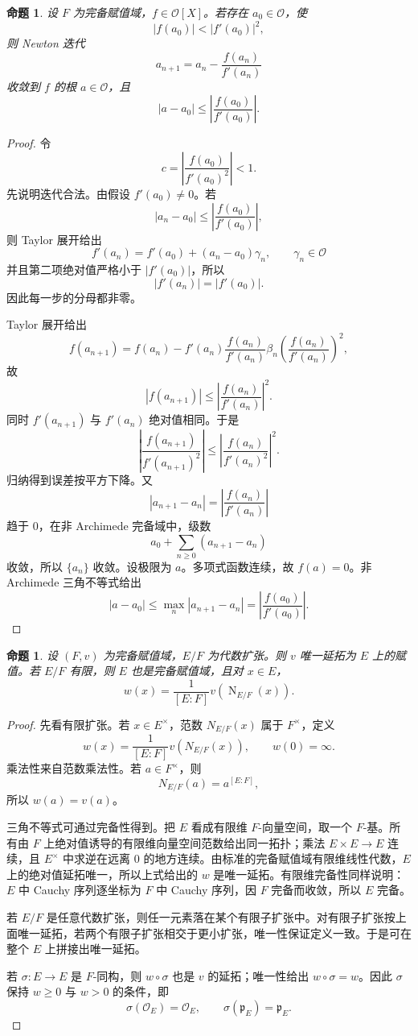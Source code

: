\documentclass[11pt,a4paper,openany]{ctexbook}
\numberwithin{equation}{chapter}
\newcommand{\Nm}{\operatorname{N}}
\theoremstyle{plain}
\newtheorem{proposition}[theorem]{命题}
\theoremstyle{definition}
\theoremstyle{remark}
\begin{document}
\begin{proposition}
设 $F$ 为完备赋值域，$f\in\mathcal O[X]$。若存在 $a_0\in\mathcal O$，使
\[
|f(a_0)|<|f'(a_0)|^2,
\]
则 Newton 迭代
\[
a_{n+1}=a_n-\frac{f(a_n)}{f'(a_n)}
\]
收敛到 $f$ 的根 $a\in\mathcal O$，且
\[
|a-a_0|\le \left|\frac{f(a_0)}{f'(a_0)}\right|.
\]
\end{proposition}

\begin{proof}
令
\[
c=\left|\frac{f(a_0)}{f'(a_0)^2}\right|<1.
\]
先说明迭代合法。由假设 $f'(a_0)\ne0$。若
\[
|a_n-a_0|\le \left|\frac{f(a_0)}{f'(a_0)}\right|,
\]
则 Taylor 展开给出
\[
f'(a_n)=f'(a_0)+(a_n-a_0)\gamma_n,\qquad \gamma_n\in\mathcal O
\]
并且第二项绝对值严格小于 $|f'(a_0)|$，所以
\[
|f'(a_n)|=|f'(a_0)|.
\]
因此每一步的分母都非零。

Taylor 展开给出
\[
f(a_{n+1})
=f(a_n)-f'(a_n)\frac{f(a_n)}{f'(a_n)}
\allowbreak
\beta_n\left(\frac{f(a_n)}{f'(a_n)}\right)^2,
\]
故
\[
|f(a_{n+1})|\le
\left|\frac{f(a_n)}{f'(a_n)}\right|^2.
\]
同时 $f'(a_{n+1})$ 与 $f'(a_n)$ 绝对值相同。于是
\[
\left|\frac{f(a_{n+1})}{f'(a_{n+1})^2}\right|
\le
\left|\frac{f(a_n)}{f'(a_n)^2}\right|^2.
\]
归纳得到误差按平方下降。又
\[
|a_{n+1}-a_n|
=\left|\frac{f(a_n)}{f'(a_n)}\right|
\]
趋于 $0$，在非 Archimede 完备域中，级数
\[
a_0+\sum_{n\ge0}(a_{n+1}-a_n)
\]
收敛，所以 $\{a_n\}$ 收敛。设极限为 $a$。多项式函数连续，故
$f(a)=0$。非 Archimede 三角不等式给出
\[
|a-a_0|\le \max_n |a_{n+1}-a_n|
=\left|\frac{f(a_0)}{f'(a_0)}\right|.
\]
\end{proof}

\begin{proposition}
设 $(F,v)$ 为完备赋值域，$E/F$ 为代数扩张。则 $v$ 唯一延拓为 $E$ 上的赋值。若 $E/F$ 有限，则 $E$ 也是完备赋值域，且对 $x\in E$，
\[
w(x)=\frac1{[E:F]}v(\Nm_{E/F}(x)).
\]
\end{proposition}

\begin{proof}
先看有限扩张。若 $x\in E^\times$，范数 $N_{E/F}(x)$ 属于 $F^\times$，定义
\[
w(x)=\frac1{[E:F]}v(N_{E/F}(x)),\qquad w(0)=\infty.
\]
乘法性来自范数乘法性。若 $a\in F^\times$，则
\[
N_{E/F}(a)=a^{[E:F]},
\]
所以 $w(a)=v(a)$。

三角不等式可通过完备性得到。把 $E$ 看成有限维 $F$-向量空间，取一个
$F$-基。所有由 $F$ 上绝对值诱导的有限维向量空间范数给出同一拓扑；乘法
$E\times E\to E$ 连续，且 $E^\times$ 中求逆在远离 $0$ 的地方连续。由标准的完备赋值域有限维线性代数，$E$ 上的绝对值延拓唯一，所以上式给出的 $w$ 是唯一延拓。有限维完备性同样说明：$E$ 中 Cauchy 序列逐坐标为 $F$ 中 Cauchy 序列，因 $F$ 完备而收敛，所以 $E$ 完备。

若 $E/F$ 是任意代数扩张，则任一元素落在某个有限子扩张中。对有限子扩张按上面唯一延拓，若两个有限子扩张相交于更小扩张，唯一性保证定义一致。于是可在整个
$E$ 上拼接出唯一延拓。

若 $\sigma:E\to E$ 是 $F$-同构，则 $w\circ\sigma$ 也是 $v$ 的延拓；唯一性给出
$w\circ\sigma=w$。因此 $\sigma$ 保持 $w\ge0$ 与 $w>0$ 的条件，即
\[
\sigma(\mathcal O_E)=\mathcal O_E,\qquad
\sigma(\mathfrak p_E)=\mathfrak p_E.
\]
\end{proof}
\end{document}
